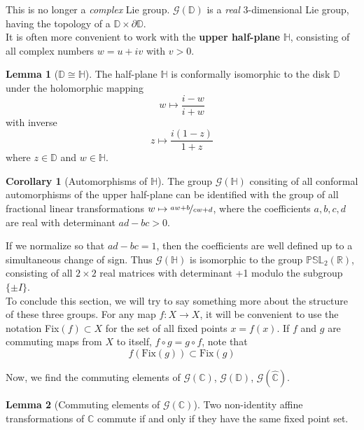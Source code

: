 \documentclass{article}
\theoremstyle{definition}
\newtheorem{lemma}{Lemma}
\newtheorem{corollary}{Corollary}
\begin{document}
    This is no longer a \textit{complex} Lie group. $\mathcal{G}(\mathbb{D})$ is a \textit{real} 3-dimensional Lie group, 
    having the topology of a  $\mathbb{D}\times\partial{\mathbb{D}}$.\\

    It is often more convenient to work with the \textbf{upper half-plane} $\mathbb{H}$, consisting of all complex numbers
    $w = u + iv$ with $v>0$.
    \begin{lemma}[$\mathbb{D}\cong\mathbb{H}$]
        The half-plane $\mathbb{H}$ is conformally isomorphic to the disk $\mathbb{D}$ under the holomorphic mapping
        \[ w \mapsto \frac{i-w}{i+w} \]
        with inverse
        \[ z\mapsto \frac{i(1-z)}{1+z} \]
        where $z\in\mathbb{D}$ and $w\in\mathbb{H}$.
    \end{lemma}

    \begin{corollary}[Automorphisms of $\mathbb{H}$]
        The group $\mathcal{G}(\mathbb{H})$ consiting of all conformal automorphisms of the upper half-plane can be identified
        with the group of all fractional linear transformations $w\mapsto \nicefrac{aw+b}{cw+d}$, where the coefficients $a,b,c,d$
        are real with determinant $ad-bc>0$.
    \end{corollary}

    If we normalize so that $ad-bc = 1$, then the coefficients are well defined up to a simultaneous change of sign. Thus
    $\mathcal{G}(\mathbb{H})$ is isomorphic to the group $\mathbb{PSL}_2(\mathbb{R})$, consisting of all $2\times 2$ real matrices
    with determinant +1 modulo the subgroup $\{\pm I\}$.\\

    To conclude this section, we will try to say something more about the structure of these three groups. For any map
    $f: X\to X$, it will be convenient to use the notation Fix$(f)\subset X$ for the set of all fixed points $x = f(x)$. If $f$
    and $g$ are commuting maps from $X$ to itself, $f\circ g = g\circ f$, note that
    \[ f(\text{Fix}(g)) \subset \text{Fix}(g) \]

    Now, we find the commuting elements of $\mathcal{G}(\mathbb{C})$, $\mathcal{G}(\mathbb{D})$, $\mathcal{G}(\hat{\mathbb{C}})$.

    \begin{lemma}[Commuting elements of $\mathcal{G}(\mathbb{C})$]
        Two non-identity affine transformations of $\mathbb{C}$ commute if and only if they have the same fixed point set.
    \end{lemma}
\end{document}
